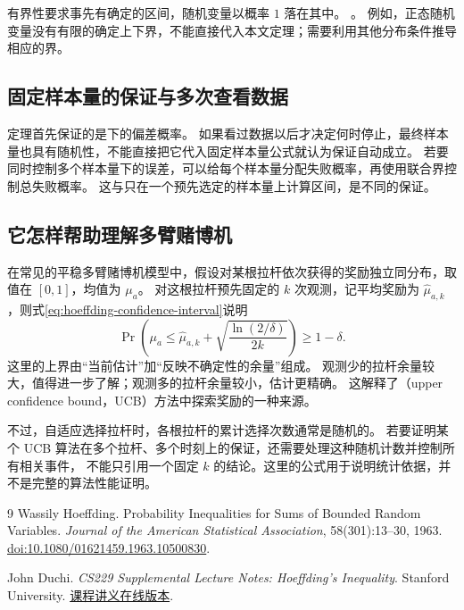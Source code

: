 \documentclass[UTF8]{ctexart}
\begin{document}
有界性要求事先有确定的区间，随机变量以概率 $1$ 落在其中。
。
例如，正态随机变量没有有限的确定上下界，不能直接代入本文定理；需要利用其他分布条件推导相应的界。

\subsection{固定样本量的保证与多次查看数据}

定理首先保证的是下的偏差概率。
如果看过数据以后才决定何时停止，最终样本量也具有随机性，不能直接把它代入固定样本量公式就认为保证自动成立。
若要同时控制多个样本量下的误差，可以给每个样本量分配失败概率，再使用联合界控制总失败概率。
这与只在一个预先选定的样本量上计算区间，是不同的保证。

\subsection{它怎样帮助理解多臂赌博机}

在常见的平稳多臂赌博机模型中，假设对某根拉杆依次获得的奖励独立同分布，取值在 $[0,1]$，均值为 $\mu_a$。
对这根拉杆预先固定的 $k$ 次观测，记平均奖励为 $\widehat\mu_{a,k}$，则式\eqref{eq:hoeffding-confidence-interval}说明
\[
  \Pr\!\left(\mu_a\leq
    \widehat\mu_{a,k}+\sqrt{\frac{\ln(2/\delta)}{2k}}\right)\geq1-\delta.
\]
这里的上界由“当前估计”加“反映不确定性的余量”组成。
观测少的拉杆余量较大，值得进一步了解；观测多的拉杆余量较小，估计更精确。
这解释了（upper confidence bound，UCB）方法中探索奖励的一种来源。

不过，自适应选择拉杆时，各根拉杆的累计选择次数通常是随机的。
若要证明某个 UCB 算法在多个拉杆、多个时刻上的保证，还需要处理这种随机计数并控制所有相关事件，
不能只引用一个固定 $k$ 的结论。这里的公式用于说明统计依据，并不是完整的算法性能证明。

\begin{thebibliography}{9}
Wassily Hoeffding.
\newblock Probability Inequalities for Sums of Bounded Random Variables.
\newblock \emph{Journal of the American Statistical Association}, 58(301):13--30, 1963.
\newblock \href{https://doi.org/10.1080/01621459.1963.10500830}{doi:10.1080/01621459.1963.10500830}.

John Duchi.
\newblock \emph{CS229 Supplemental Lecture Notes: Hoeffding's Inequality}.
\newblock Stanford University.
\newblock \href{https://cs229.stanford.edu/notes_archive/cs229-notes-all/hoeffding.pdf}{课程讲义在线版本}.
\end{thebibliography}
\end{document}
